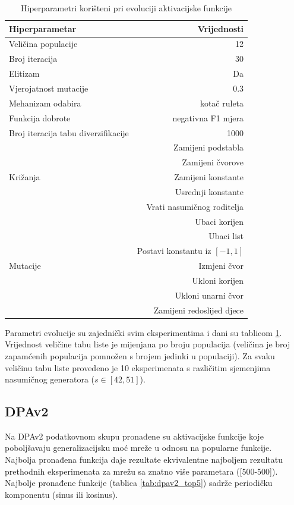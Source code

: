 \documentclass[times, utf8, numeric, diplomski]{fer}
\begin{document}
\begin{table}[H]
\centering
\begin{tabular}{lr}
Hiperparametar & Vrijednosti \\
\hline
Veličina populacije & 12 \\
Broj iteracija & 30 \\
Elitizam & Da \\
Vjerojatnost mutacije & 0.3 \\
Mehanizam odabira & kotač ruleta \\
Funkcija dobrote & negativna F1 mjera \\
Broj iteracija tabu diverzifikacije & 1000 \\
\hline
\multirow{5}{*}{Križanja}
& Zamijeni podstabla \\
& Zamijeni čvorove \\
& Zamijeni konstante \\
& Usrednji konstante \\
& Vrati nasumičnog roditelja \\
\hline
\multirow{7}{*}{Mutacije}
& Ubaci korijen \\
& Ubaci list \\
& Postavi konstantu iz $[-1,1]$ \\
& Izmjeni čvor \\
& Ukloni korijen \\
& Ukloni unarni čvor \\
& Zamijeni redoslijed djece \\
\end{tabular}
\caption{Hiperparametri korišteni pri evoluciji aktivacijske funkcije}
\label{tab:gp_hiperparams}
\end{table}

Parametri evolucije su zajednički svim eksperimentima i dani su tablicom \ref{tab:gp_hiperparams}. Vrijednost veličine tabu liste je mijenjana po broju populacija (veličina je broj zapamćenih populacija pomnožen s brojem jedinki u populaciji). Za svaku veličinu tabu liste provedeno je 10 eksperimenata s različitim sjemenjima nasumičnog generatora ($s \in [42,51]$).

\subsection{DPAv2}
Na DPAv2 podatkovnom skupu pronađene su aktivacijske funkcije koje poboljšavaju generalizacijsku moć mreže u odnosu na popularne funkcije. Najbolja pronađena funkcija daje rezultate ekvivalentne najboljem rezultatu prethodnih eksperimenata za mrežu sa znatno više parametara ([500-500]). Najbolje pronađene funkcije (tablica \ref{tab:dpav2_top5}) sadrže periodičku komponentu (sinus ili kosinus).
\end{document}
